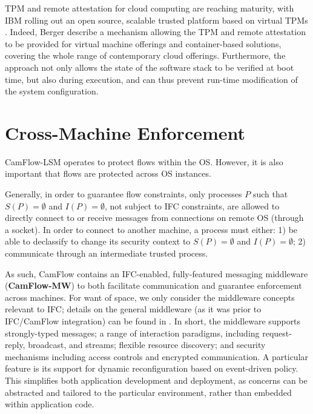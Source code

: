 \documentclass[10pt,journal,compsoc]{IEEEtran}
\begin{document}
TPM and remote attestation for cloud computing \cite{perez2006vtpm} are reaching maturity, with IBM rolling out an open source, scalable trusted platform based on virtual TPMs \cite{BergerIC2E2015}. 
Indeed, Berger \etal \cite{BergerIC2E2015} describe a mechanism allowing the TPM and remote attestation to be provided for virtual machine offerings and container-based solutions, covering the whole range of contemporary cloud offerings.
Furthermore, the approach not only allows the state of the software stack to be verified at boot time, but also during execution, and can thus prevent run-time modification of the system configuration.



 
\section{Cross-Machine Enforcement}
\label{sec:mw}











CamFlow-LSM operates to protect flows within the OS. However, it is also important that flows are protected across OS instances.

Generally, in order to guarantee flow constraints, only processes $P$ such that $S(P)=\emptyset$ and $I(P)=\emptyset$, \ie not subject to IFC constraints, are allowed to directly connect to or receive messages from  connections on remote OS (\eg through a socket). In order to connect to another machine, a process must either:
1) be able to declassify to change its security context to $S(P)=\emptyset$ and $I(P)=\emptyset$;
2) communicate through an intermediate trusted process.


As such, CamFlow contains an IFC-enabled, fully-featured messaging middleware (\textbf{CamFlow-MW}) to 
both facilitate communication and guarantee enforcement across machines.
For want of space, we only consider the middleware concepts relevant to IFC; details on the general middleware (as it was prior to IFC\slash CamFlow integration) can be found in \cite{debs14SBUStutorial}.
In short, the middleware supports strongly-typed messages; a range of interaction paradigms, including request-reply, broadcast, and streams; flexible resource discovery; and security mechanisms including access controls and encrypted communication. 
A particular feature is its support for dynamic reconfiguration based on event-driven policy. This simplifies both application development and deployment, as concerns can be abstracted and tailored to the particular environment, rather than embedded within application code.
\end{document}

